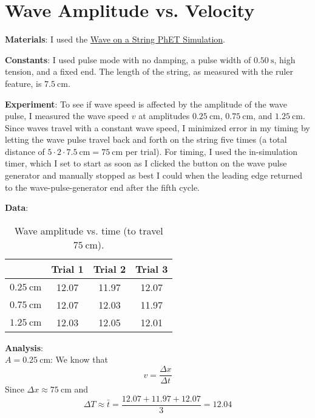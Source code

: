 \documentclass{article}
\begin{document}
\section{Wave Amplitude vs. Velocity}
\textbf{Materials}: I used the \href{https://phet.colorado.edu/sims/html/wave-on-a-string/latest/wave-on-a-string_en.html}{Wave on a String PhET Simulation}.\par
\textbf{Constants}: I used pulse mode with no damping, a pulse width of $\SI{0.50}{\second}$, high tension, and a fixed end. The length of the string, as measured with the ruler feature, is $\SI{7.5}{\centi\meter}$.\par
\textbf{Experiment}: To see if wave speed is affected by the amplitude of the wave pulse, I measured the wave speed $v$ at amplitudes $\SI{0.25}{\centi\meter}$, $\SI{0.75}{\centi\meter}$, and $\SI{1.25}{\centi\meter}$. Since waves travel with a constant wave speed, I minimized error in my timing by letting the wave pulse travel back and forth on the string five times (a total distance of $5\cdot 2\cdot\SI{7.5}{\centi\meter}=\SI{75}{\centi\meter}$ per trial). For timing, I used the in-simulation timer, which I set to start as soon as I clicked the button on the wave pulse generator and manually stopped as best I could when the leading edge returned to the wave-pulse-generator end after the fifth cycle.\par
\textbf{Data}:
\begin{table}[h!]
    \centering
    \renewcommand{\arraystretch}{1.4}
    \begin{tabular}{c|ccc}
                                  & Trial 1 & Trial 2 & Trial 3\\
        \hline
        $\SI{0.25}{\centi\meter}$ & 12.07   & 11.97   & 12.07\\
        $\SI{0.75}{\centi\meter}$ & 12.07   & 12.03   & 11.97\\
        $\SI{1.25}{\centi\meter}$ & 12.03   & 12.05   & 12.01\\
    \end{tabular}
    \caption{Wave amplitude vs. time (to travel $\SI{75}{\centi\meter}$).}
    \label{fig:exp1data}
\end{table}\par
\textbf{Analysis}:\\
$A=\SI{0.25}{\centi\meter}$: We know that
\begin{equation*}
    v = \frac{\Delta x}{\Delta t}
\end{equation*}
Since $\Delta x\approx\SI{75}{\centi\meter}$ and
\begin{equation*}
    \Delta T \approx \bar{t} = \frac{12.07+11.97+12.07}{3} = 12.04
\end{equation*}
\end{document}
